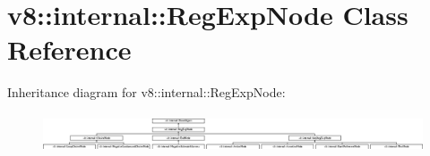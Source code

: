\hypertarget{classv8_1_1internal_1_1_reg_exp_node}{}\section{v8\+:\+:internal\+:\+:Reg\+Exp\+Node Class Reference}
\label{classv8_1_1internal_1_1_reg_exp_node}
Inheritance diagram for v8\+:\+:internal\+:\+:Reg\+Exp\+Node\+:\begin{figure}[H]
\begin{center}
\leavevmode
\includegraphics[height=1.163636cm]{classv8_1_1internal_1_1_reg_exp_node}
\end{center}
\end{figure}
